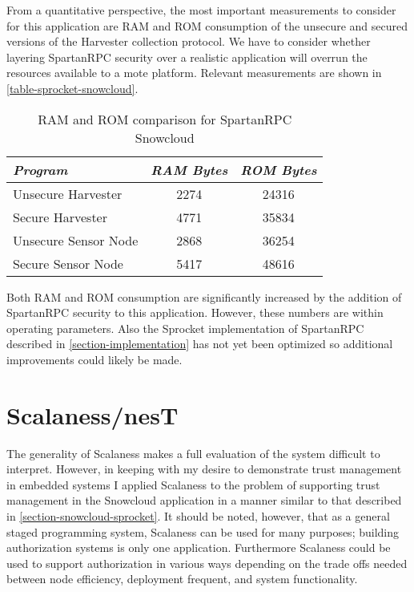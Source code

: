 From a quantitative perspective, the most important measurements to consider for this
application are RAM and ROM consumption of the unsecure and secured versions of the Harvester
collection protocol. We have to consider whether layering SpartanRPC security over a realistic
application will overrun the resources available to a mote platform. Relevant measurements are
shown in \autoref{table-sprocket-snowcloud}.

\begin{table}[h]
\centering \newcommand\T{\rule{0pt}{2.1ex}}
\caption{RAM and ROM comparison for SpartanRPC Snowcloud} {
\begin{tabular}{|l|c|c|}
\hline
\emph{Program} \T       & \emph{RAM Bytes} & \emph{ROM Bytes} \\ \hline\hline
Unsecure Harvester \T   &             2274 &            24316 \\ \hline
Secure Harvester \T     &             4771 &            35834 \\ \hline
Unsecure Sensor Node \T &             2868 &            36254 \\ \hline
Secure Sensor Node \T   &             5417 &            48616 \\ \hline
\end{tabular}
}
\label{table-sprocket-snowcloud}
\end{table}

Both RAM and ROM consumption are significantly increased by the addition of SpartanRPC security
to this application. However, these numbers are within operating parameters. Also the Sprocket
implementation of SpartanRPC described in \autoref{section-implementation} has not yet been
optimized so additional improvements could likely be made.

\section{Scalaness/nesT}
\label{section-scalaness-evaluation}

The generality of Scalaness makes a full evaluation of the system difficult to interpret.
However, in keeping with my desire to demonstrate trust management in embedded systems I applied
Scalaness to the problem of supporting trust management in the Snowcloud application in a manner
similar to that described in \autoref{section-snowcloud-sprocket}. It should be noted, however,
that as a general staged programming system, Scalaness can be used for many purposes; building
authorization systems is only one application. Furthermore Scalaness could be used to support
authorization in various ways depending on the trade offs needed between node efficiency,
deployment frequent, and system functionality.

